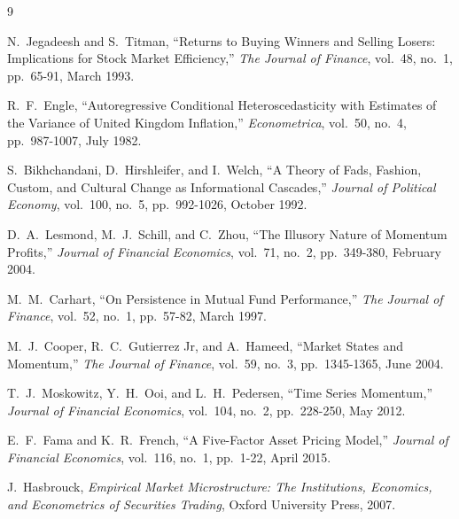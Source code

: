 \documentclass[twocolumn,ieee]{arithmaxresearch}
\begin{document}
\begin{thebibliography}{9}

N.\ Jegadeesh and S.\ Titman, ``Returns to Buying Winners and Selling Losers: Implications for Stock Market Efficiency,'' \emph{The Journal of Finance}, vol.\ 48, no.\ 1, pp.\ 65-91, March 1993.

R.\ F.\ Engle, ``Autoregressive Conditional Heteroscedasticity with Estimates of the Variance of United Kingdom Inflation,'' \emph{Econometrica}, vol.\ 50, no.\ 4, pp.\ 987-1007, July 1982.

S.\ Bikhchandani, D.\ Hirshleifer, and I.\ Welch, ``A Theory of Fads, Fashion, Custom, and Cultural Change as Informational Cascades,'' \emph{Journal of Political Economy}, vol.\ 100, no.\ 5, pp.\ 992-1026, October 1992.

D.\ A.\ Lesmond, M.\ J.\ Schill, and C.\ Zhou, ``The Illusory Nature of Momentum Profits,'' \emph{Journal of Financial Economics}, vol.\ 71, no.\ 2, pp.\ 349-380, February 2004.

M.\ M.\ Carhart, ``On Persistence in Mutual Fund Performance,'' \emph{The Journal of Finance}, vol.\ 52, no.\ 1, pp.\ 57-82, March 1997.

M.\ J.\ Cooper, R.\ C.\ Gutierrez Jr, and A.\ Hameed, ``Market States and Momentum,'' \emph{The Journal of Finance}, vol.\ 59, no.\ 3, pp.\ 1345-1365, June 2004.

T.\ J.\ Moskowitz, Y.\ H.\ Ooi, and L.\ H.\ Pedersen, ``Time Series Momentum,'' \emph{Journal of Financial Economics}, vol.\ 104, no.\ 2, pp.\ 228-250, May 2012.

E.\ F.\ Fama and K.\ R.\ French, ``A Five-Factor Asset Pricing Model,'' \emph{Journal of Financial Economics}, vol.\ 116, no.\ 1, pp.\ 1-22, April 2015.

J.\ Hasbrouck, \emph{Empirical Market Microstructure: The Institutions, Economics, and Econometrics of Securities Trading}, Oxford University Press, 2007.

\end{thebibliography}

\vspace{1em}
\begin{center}
\arithmaxlogoscaled[3cm]
\end{center}
\end{document}
